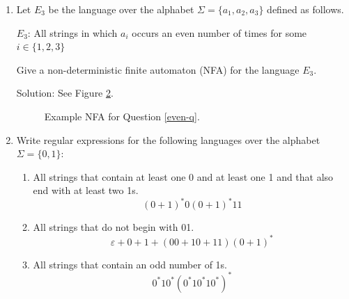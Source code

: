 \documentclass[11pt]{article}
\begin{document}
\begin{enumerate}
{\bf Aside}: This example illustrates that regular languages are
closed under intersection and complementation. Note that
$L_3 = L_1 \cap L_2$ and $L_4 = \Sigma^{*} - L_3$, where $\Sigma^{*}$
represents the language containing all strings over the alphabet
$\Sigma$.

Solution: See Figure \ref{closure}.

\begin{figure}[htb]
\begin{center}

\caption{Example DFAs for Question \ref{closure-q}.}
\label{closure}
\end{center}
\end{figure}

\item
\label{even-q}
Let $E_{3}$ be the language over the alphabet
$\Sigma = \{a_{1}, a_{2}, a_{3}\}$ defined as follows.
\begin{center}
$E_{3}$: All strings in which $a_{i}$ occurs an even number of times
for some $i \in \{1, 2, 3\}$
\end{center}
Give a non-deterministic finite automaton (NFA) for the language
$E_{3}$.

Solution: See Figure \ref{even}.

\begin{figure}[htb]
\begin{center}

\caption{Example NFA for Question \ref{even-q}.}
\label{even}
\end{center}
\end{figure}

\item
Write regular expressions for the following languages over the
alphabet $\Sigma = \{0, 1\}$:
\begin{enumerate}
\item All strings that contain at least one 0 and at least one 1 and
that also end with at least two 1s.
\[
(0 + 1)^{*}0(0 + 1)^{*}11
\]
\item All strings that do not begin with 01.
\[
\varepsilon + 0 + 1 + (00 + 10 + 11)(0 + 1)^{*}
\]
\item All strings that contain an odd number of 1s.
\[
0^{*}10^{*}(0^{*}10^{*}10^{*})^{*}
\]
\end{enumerate}


\end{enumerate}
\end{document}
